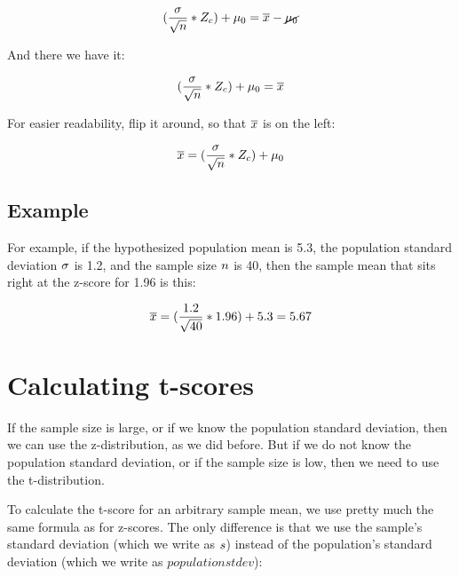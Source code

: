 \documentclass[../../../main.tex]{subfiles}
\begin{document}
\begin{equation*}
  (\frac{\populationstdev}{\sqrt{\samplesize/}} * Z_{c}) + \HypPopMean/ = \samplemean{x} - \cancel{\HypPopMean/}
\end{equation*}

\noindent
And there we have it:

\begin{equation*}
  (\frac{\populationstdev}{\sqrt{\samplesize/}} * Z_{c}) + \HypPopMean/ = \samplemean{x}
\end{equation*}

\noindent
For easier readability, flip it around, so that $\overline{x}$ is on the left:

\begin{equation*}
  \samplemean{x} = (\frac{\populationstdev}{\sqrt{\samplesize/}} * Z_{c}) + \HypPopMean/
\end{equation*}


\subsection{Example}

For example, if the hypothesized population mean is 5.3, the population standard deviation $\sigma$ is 1.2, and the sample size $\samplesize/$ is 40, then the sample mean that sits right at the z-score for 1.96 is this:

\begin{equation*}
  \overline{x} = (\frac{1.2}{\sqrt{40}} * 1.96) + 5.3 = 5.67
\end{equation*}


\section{Calculating t-scores}

If the sample size is large, or if we know the population standard deviation, then we can use the z-distribution, as we did before. But if we do not know the population standard deviation, or if the sample size is low, then we need to use the t-distribution.

To calculate the t-score for an arbitrary sample mean, we use pretty much the same formula as for z-scores. The only difference is that we use the sample's standard deviation (which we write as $s$) instead of the population's standard deviation (which we write as $populationstdev$):
\end{document}
